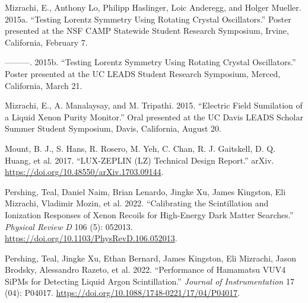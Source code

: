 \documentclass[
  10pt,
  letterpaper,
  DIV=11,
  numbers=noendperiod]{scrartcl}
\newlength{\cslhangindent}
\newlength{\cslentryspacingunit} %
\newenvironment{CSLReferences}[2] %
 {%
  \setlength{\parindent}{0pt}
  \ifodd #1
  \let\oldpar\par
  \def\par{\hangindent=\cslhangindent\oldpar}
  \fi
  \setlength{\parskip}{#2\cslentryspacingunit}
 }%
 {}
\begin{document}
\begin{CSLReferences}{1}{0}
\leavevmode{}%
Mizrachi, E., Anthony Lo, Philipp Haslinger, Loic Anderegg, and Holger
Mueller. 2015a. {``Testing {Lorentz Symmetry Using Rotating Crystal
Oscillators}.''} Poster presented at the {NSF CAMP Statewide Student
Research Symposium}, {Irvine, California}, February 7.

\leavevmode{}%
---------. 2015b. {``Testing {Lorentz Symmetry Using Rotating Crystal
Oscillators}.''} Poster presented at the {UC LEADS Student Research
Symposium}, {Merced, California}, March 21.

\leavevmode{}%
Mizrachi, E., A. Manalaysay, and M. Tripathi. 2015. {``Electric {Field
Sumilation} of a {Liquid Xenon Purity Monitor}.''} Oral presented at the
{UC Davis LEADS Scholar Summer Student Symposium}, {Davis, California},
August 20.

\leavevmode{}%
Mount, B. J., S. Hans, R. Rosero, M. Yeh, C. Chan, R. J. Gaitskell, D.
Q. Huang, et al. 2017. {``{LUX-ZEPLIN} ({LZ}) {Technical Design
Report}.''} {arXiv}. \url{https://doi.org/10.48550/arXiv.1703.09144}.

\leavevmode{}%
Pershing, Teal, Daniel Naim, Brian Lenardo, Jingke Xu, James Kingston,
Eli Mizrachi, Vladimir Mozin, et al. 2022. {``Calibrating the
Scintillation and Ionization Responses of Xenon Recoils for High-Energy
Dark Matter Searches.''} \emph{Physical Review D} 106 (5): 052013.
\url{https://doi.org/10.1103/PhysRevD.106.052013}.

\leavevmode{}%
Pershing, Teal, Jingke Xu, Ethan Bernard, James Kingston, Eli Mizrachi,
Jason Brodsky, Alessandro Razeto, et al. 2022. {``Performance of
{Hamamatsu VUV4 SiPMs} for Detecting Liquid Argon Scintillation.''}
\emph{Journal of Instrumentation} 17 (04): P04017.
\url{https://doi.org/10.1088/1748-0221/17/04/P04017}.

\end{CSLReferences}
\end{document}
